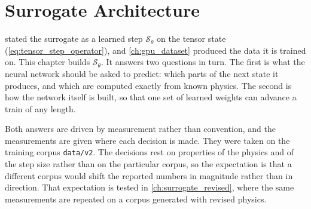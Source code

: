\chapter{Surrogate Architecture}
\label{ch:architecture}


 stated the surrogate as a learned step $\mathcal{S}_\theta$ on the tensor state (\cref{eq:tensor_step_operator}), and \cref{ch:gpu_dataset} produced the data it is trained on. This chapter builds $\mathcal{S}_\theta$. It answers two questions in turn. The first is what the neural network should be asked to predict: which parts of the next state it produces, and which are computed exactly from known physics. The second is how the network itself is built, so that one set of learned weights can advance a train of any length.

Both answers are driven by measurement rather than convention, and the measurements are given where each decision is made. They were taken on the training corpus \texttt{data/v2}. The decisions rest on properties of the physics and of the step size rather than on the particular corpus, so the expectation is that a different corpus would shift the reported numbers in magnitude rather than in direction. That expectation is tested in \cref{ch:surrogate_revised}, where the same measurements are repeated on a corpus generated with revised physics.

